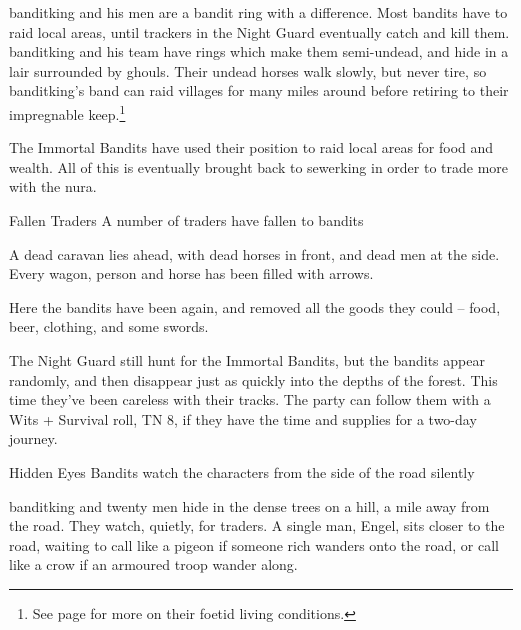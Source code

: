 \begin{multicols}{2}
\resumecontents[Town]

\stopcontents[sq]

\label{immortalbandits}

\stopcontents[Town]

\startcontents[sq]

\sqminitoc

\noindent
\Gls{banditking} and his men are a bandit ring with a difference.
Most bandits have to raid local areas, until trackers in the Night Guard eventually catch and kill them.
\Gls{banditking} and his team have rings which make them semi-undead, and hide in a lair surrounded by ghouls.
Their undead horses walk slowly, but never tire, so \gls{banditking}'s band can raid villages for many miles around before retiring to their impregnable keep.\footnote{See page \pageref{necromancers_lair} for more on their foetid living conditions.}

The Immortal Bandits have used their position to raid local areas for food and wealth.
All of this is eventually brought back to \gls{sewerking} in order to trade more with the nura.

{Fallen Traders}%
{A number of traders have fallen to bandits}%

\begin{boxtext}

	A dead caravan lies ahead, with dead horses in front, and dead men at the side.  Every wagon, person and horse has been filled with arrows.

\end{boxtext}

Here the bandits have been again, and removed all the goods they could -- food, beer, clothing, and some swords.

The Night Guard still hunt for the Immortal Bandits, but the bandits appear randomly, and then disappear just as quickly into the depths of the forest.
This time they've been careless with their tracks.
The party can follow them with a Wits + Survival roll, TN 8, if they have the time and supplies for a two-day journey.

{Hidden Eyes}%
{Bandits watch the characters from the side of the road silently}%

\gls{banditking} and twenty men hide in the dense trees on a hill, a mile away from the road.
They watch, quietly, for traders.
A single man, Engel, sits closer to the road, waiting to call like a pigeon if someone rich wanders onto the road, or call like a crow if an armoured troop wander along.


\end{multicols}
